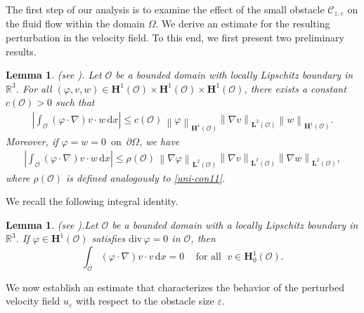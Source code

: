 \documentclass[a4paper,12pt,reqno,natbib]{amsart}
\newtheorem{lemma}[theorem]{Lemma}
\newcommand{\dx} {\displaystyle\mathrm{d}x}
\def\O{\mathcal O}
\def\H{\textbf{H}}
\def\L{\textbf{L}}
\begin{document}
The first step of our analysis is to examine the effect of the small obstacle 
$\mathcal{C}_{z,\varepsilon}$ on the fluid flow within the domain $\Omega$. 
We derive an estimate for the resulting perturbation in the velocity field. 
To this end, we first present two preliminary results.

\begin{lemma} \label{lem-NS-prelim1}(see \cite[Lemma IX.1.1, p. 588]{galdi2011introduction}).  Let \( \O \) be a bounded domain with locally Lipschitz boundary in \( \mathbb{R}^3 \). For all $(\varphi,v,w)\in\H^1(\O)\times \H^1(\O)\times \H^1(\O)$, there exists a constant $c(\O)>0$ such that
\begin{eqnarray}
\displaystyle \left|\int_{\O}  (\varphi\cdot \nabla)v\cdot w\, \dx\right |\leq c(\O)\,\left\|\varphi\right\|_{\H^1(\O)}\left\|\nabla v\right\|_{\L^2(\O)}\left\| w\right\|_{\H^1(\O)}.
\end{eqnarray}
Moreover, if $\varphi=w=0\,\mbox{ on }\,\partial \Omega$, we have
\begin{eqnarray}
\displaystyle  \left|\int_{\O}  (\varphi\cdot \nabla)v\cdot w\, \dx\right |\leq \rho(\O)\,\left\|\nabla \varphi\right\|_{\L^2(\O)}\left\|\nabla v\right\|_{\L^2(\O)}\left\| \nabla w\right\|_{\L^2(\O)},
\end{eqnarray}
where $\rho(\O)$ is defined analogously to \eqref{uni-con11}.
\end{lemma}

We recall the following integral identity. 

\begin{lemma} (see  \cite[ Lemma IX.2.1, p. 591]{galdi2011introduction}).\label{lem-NS-prelim2} Let \( \O \) be a bounded domain with a locally Lipschitz boundary in \( \mathbb{R}^3 \). If \( \varphi \in \H^1(\O) \) satisfies \( \text{div} \, \varphi = 0 \) in \( \O \), then  
    \begin{equation}
        \int_{\O} (\varphi\cdot \nabla)v \cdot v\, \dx = 0\;\;\; \text{  for all  }\;v\in\H^1_0(\O).
    \end{equation}
\end{lemma}

We now establish an estimate that characterizes the behavior of the perturbed velocity field $u_\varepsilon$ with respect to the obstacle size $\varepsilon.$
\end{document}
